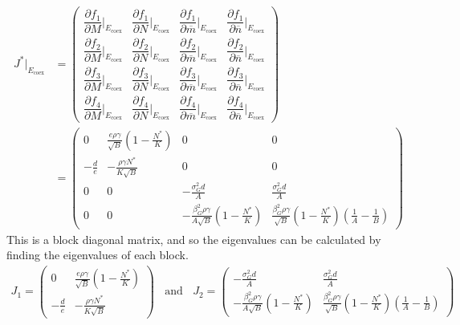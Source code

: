 \documentclass{amsart}
\theoremstyle{definition}
\theoremstyle{remark}
\numberwithin{equation}{section}
\begin{document}
\begin{align*}
	J^*|_{E_{\text{coex}}} &= \left(\begin{array}{cccc}
		\dfrac{\partial f_1}{\partial M}\Big|_{E_{\text{coex}}} & \dfrac{\partial f_1}{\partial N}\Big|_{E_{\text{coex}}} & \dfrac{\partial f_1}{\partial \overline{m}}\Big|_{E_{\text{coex}}} & \dfrac{\partial f_1}{\partial \overline{n}}\Big|_{E_{\text{coex}}} \\[10px]
		\dfrac{\partial f_2}{\partial M}\Big|_{E_{\text{coex}}} & \dfrac{\partial f_2}{\partial N}\Big|_{E_{\text{coex}}} & \dfrac{\partial f_2}{\partial \overline{m}}\Big|_{E_{\text{coex}}} & \dfrac{\partial f_2}{\partial \overline{n}}\Big|_{E_{\text{coex}}} \\[10px]
		\dfrac{\partial f_3}{\partial M}\Big|_{E_{\text{coex}}} & \dfrac{\partial f_3}{\partial N}\Big|_{E_{\text{coex}}} & \dfrac{\partial f_3}{\partial \overline{m}}\Big|_{E_{\text{coex}}} & \dfrac{\partial f_3}{\partial \overline{n}}\Big|_{E_{\text{coex}}} \\[10px]
		\dfrac{\partial f_4}{\partial M}\Big|_{E_{\text{coex}}} & \dfrac{\partial f_4}{\partial N}\Big|_{E_{\text{coex}}} & \dfrac{\partial f_4}{\partial \overline{m}}\Big|_{E_{\text{coex}}} & \dfrac{\partial f_4}{\partial \overline{n}}\Big|_{E_{\text{coex}}}
	\end{array}\right) \\
	&= \left(\begin{array}{cccc}
		0 & \frac{e\rho\gamma}{\sqrt{B}}\left(1 - \frac{N^*}{K}\right) & 0 & 0 \\
		-\frac{d}{e} & -\frac{\rho\gamma N^*}{K\sqrt{B}} & 0 & 0 \\
		0 & 0 & -\frac{\sigma_G^2d}{A} & \frac{\sigma_G^2d}{A} \\
		0 & 0 & -\frac{\beta_G^2\rho\gamma}{A\sqrt{B}}\left(1 - \frac{N^*}{K}\right) & \frac{\beta_G^2\rho\gamma}{\sqrt{B}}\left(1 - \frac{N^*}{K}\right)\left(\frac{1}{A} - \frac{1}{B}\right)
	\end{array}\right)
\end{align*}
This is a block diagonal matrix, and so the eigenvalues can be calculated by finding the eigenvalues of each block.
\begin{align*}
	J_1 = \left(\begin{array}{cc}
		0 & \frac{e\rho\gamma}{\sqrt{B}}\left(1 - \frac{N^*}{K}\right)\\
		-\frac{d}{e} & -\frac{\rho\gamma N^*}{K\sqrt{B}}
	\end{array}\right)\ \ \ \ \text{and}\ \ \ \ J_2 = \left(\begin{array}{cc}
		-\frac{\sigma_G^2d}{A} & \frac{\sigma_G^2d}{A} \\
        -\frac{\beta_G^2\rho\gamma}{A\sqrt{B}}\left(1 - \frac{N^*}{K}\right) & \frac{\beta_G^2\rho\gamma}{\sqrt{B}}\left(1 - \frac{N^*}{K}\right)\left(\frac{1}{A} - \frac{1}{B}\right)
	\end{array}\right)
\end{align*}
\end{document}
